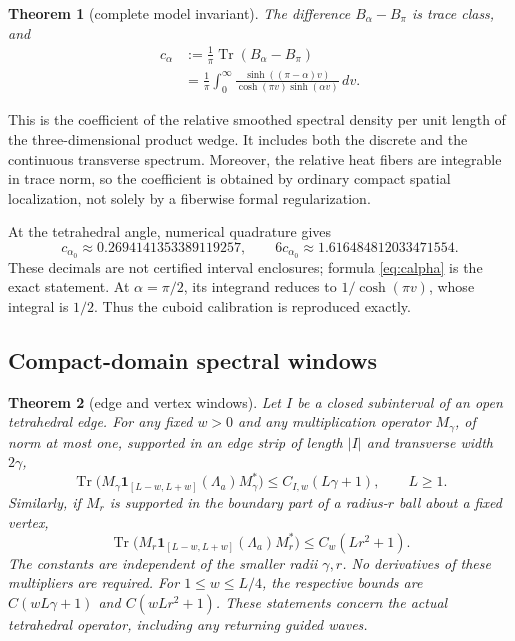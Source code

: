 \documentclass[11pt]{amsart}
\numberwithin{equation}{section}
\newtheorem{theorem}{Theorem}[section]
\theoremstyle{remark}
\newcommand{\Tr}{\operatorname{Tr}}
\newcommand{\one}{\mathbf{1}}
\begin{document}
\begin{theorem}[complete model invariant]\label{thm:invariant}
The difference $B_\alpha-B_\pi$ is trace class, and
\begin{equation}\label{eq:calpha}
\begin{aligned}
c_\alpha&:=\frac1\pi\Tr(B_\alpha-B_\pi)\\
&=\frac1\pi\int_0^\infty\frac{\sinh((\pi-\alpha)v)}{\cosh(\pi v)\sinh(\alpha v)}\,dv .
\end{aligned}
\end{equation}
\end{theorem}

This is the coefficient of the relative smoothed spectral density per unit length of the three-dimensional product wedge. It includes both the discrete and the continuous transverse spectrum. Moreover, the relative heat fibers are integrable in trace norm, so the coefficient is obtained by ordinary compact spatial localization, not solely by a fiberwise formal regularization.

At the tetrahedral angle, numerical quadrature gives
\begin{equation}\label{eq:numval}
c_{\alpha_0}\approx 0.2694141353389119257,\qquad 6c_{\alpha_0}\approx1.616484812033471554 .
\end{equation}
These decimals are not certified interval enclosures; formula \eqref{eq:calpha} is the exact statement. At $\alpha=\pi/2$, its integrand reduces to $1/\cosh(\pi v)$, whose integral is $1/2$. Thus the cuboid calibration is reproduced exactly.

\subsection{Compact-domain spectral windows}
\begin{theorem}[edge and vertex windows]\label{thm:windows}
Let $I$ be a closed subinterval of an open tetrahedral edge. For any fixed $w>0$ and any multiplication operator $M_\gamma$, of norm at most one, supported in an edge strip of length $|I|$ and transverse width $2\gamma$,
\begin{equation}\label{eq:edgewindow}
\Tr\big(M_\gamma\one_{[L-w,L+w]}(\Lambda_a)M_\gamma^*\big)\le C_{I,w}(L\gamma+1),\qquad L\ge1 .
\end{equation}
Similarly, if $M_r$ is supported in the boundary part of a radius-$r$ ball about a fixed vertex,
\begin{equation}\label{eq:vertexwindow}
\Tr\big(M_r\one_{[L-w,L+w]}(\Lambda_a)M_r^*\big)\le C_w(Lr^2+1) .
\end{equation}
The constants are independent of the smaller radii $\gamma,r$. No derivatives of these multipliers are required. For $1\le w\le L/4$, the respective bounds are $C(wL\gamma+1)$ and $C(wLr^2+1)$. These statements concern the actual tetrahedral operator, including any returning guided waves.
\end{theorem}
\end{document}
